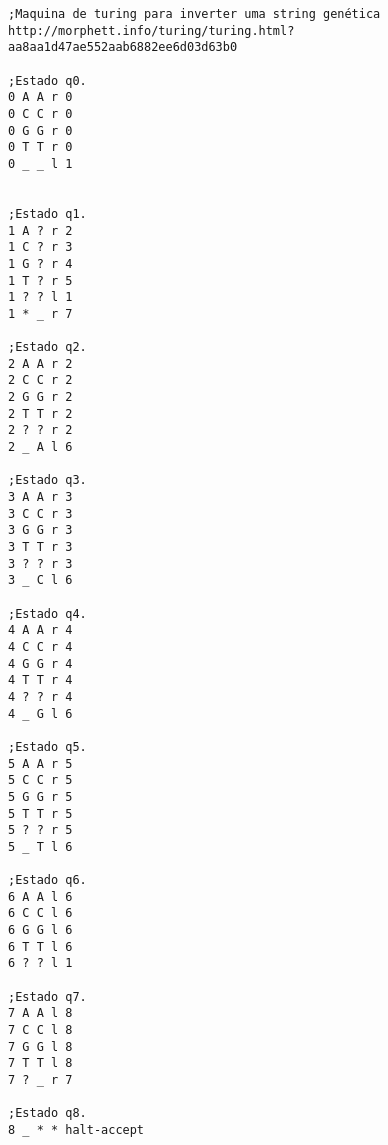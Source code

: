 \documentclass[12pt]{scrartcl}
\begin{document}

\begin{verbatim}
;Maquina de turing para inverter uma string genética
http://morphett.info/turing/turing.html?aa8aa1d47ae552aab6882ee6d03d63b0 

;Estado q0.
0 A A r 0
0 C C r 0
0 G G r 0
0 T T r 0
0 _ _ l 1


;Estado q1.
1 A ? r 2
1 C ? r 3
1 G ? r 4
1 T ? r 5
1 ? ? l 1
1 * _ r 7

;Estado q2.
2 A A r 2
2 C C r 2
2 G G r 2
2 T T r 2
2 ? ? r 2
2 _ A l 6

;Estado q3.
3 A A r 3
3 C C r 3
3 G G r 3
3 T T r 3
3 ? ? r 3
3 _ C l 6

;Estado q4.
4 A A r 4
4 C C r 4
4 G G r 4
4 T T r 4
4 ? ? r 4
4 _ G l 6

;Estado q5.
5 A A r 5
5 C C r 5
5 G G r 5
5 T T r 5
5 ? ? r 5
5 _ T l 6

;Estado q6.
6 A A l 6
6 C C l 6
6 G G l 6
6 T T l 6
6 ? ? l 1

;Estado q7.
7 A A l 8
7 C C l 8
7 G G l 8
7 T T l 8
7 ? _ r 7

;Estado q8.
8 _ * * halt-accept
\end{verbatim}
\end{document}
